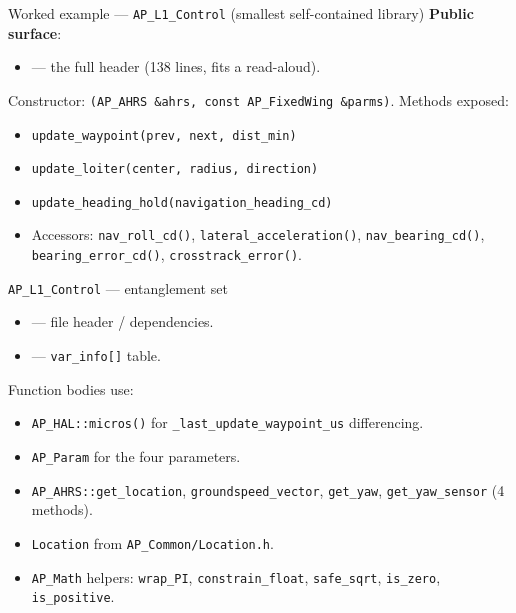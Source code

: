 \documentclass[aspectratio=169,11pt]{beamer}
\begin{document}
\begin{frame}{Worked example --- \texttt{AP\_L1\_Control} (smallest self-contained library)}
  \textbf{Public surface}:
  \begin{itemize}
    \item {} --- the full header (138 lines, fits a read-aloud).
  \end{itemize}
  \vfill
  Constructor: \texttt{(AP\_AHRS \&ahrs, const AP\_FixedWing \&parms)}.
  \vfill
  Methods exposed:
  \begin{itemize}
    \item \texttt{update\_waypoint(prev, next, dist\_min)}
    \item \texttt{update\_loiter(center, radius, direction)}
    \item \texttt{update\_heading\_hold(navigation\_heading\_cd)}
    \item Accessors: \texttt{nav\_roll\_cd()}, \texttt{lateral\_acceleration()}, \texttt{nav\_bearing\_cd()}, \texttt{bearing\_error\_cd()}, \texttt{crosstrack\_error()}.
  \end{itemize}
\end{frame}

\begin{frame}{\texttt{AP\_L1\_Control} --- entanglement set}
  \begin{itemize}
    \item {} --- file header / dependencies.
    \item {} --- \texttt{var\_info[]} table.
  \end{itemize}
  \vfill
  Function bodies use:
  \begin{itemize}
    \item \texttt{AP\_HAL::micros()} for \texttt{\_last\_update\_waypoint\_us} differencing.
    \item \texttt{AP\_Param} for the four  parameters.
    \item \texttt{AP\_AHRS::get\_location}, \texttt{groundspeed\_vector}, \texttt{get\_yaw}, \texttt{get\_yaw\_sensor} (4 methods).
    \item \texttt{Location} from \texttt{AP\_Common/Location.h}.
    \item \texttt{AP\_Math} helpers: \texttt{wrap\_PI}, \texttt{constrain\_float}, \texttt{safe\_sqrt}, \texttt{is\_zero}, \texttt{is\_positive}.
  \end{itemize}
\end{frame}
\end{document}
